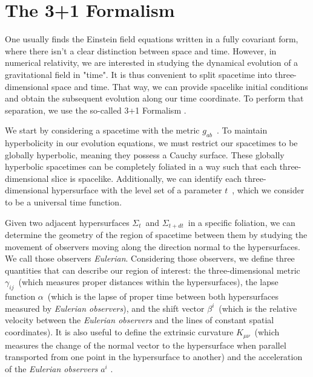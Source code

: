 \section{The 3+1 Formalism}
\label{section:3+1_formalism}

One usually finds the Einstein field equations written in a fully covariant form, where there isn't a clear distinction between space and time. However, in numerical relativity, we are interested in studying the dynamical evolution of a gravitational field in "time". It is thus convenient to split spacetime into three-dimensional space and time. That way, we can provide spacelike initial conditions and obtain the subsequent evolution along our time coordinate. To perform that separation, we use the so-called 3+1 Formalism \cite{3+1_Formalism_and_Bases_of_Numerical_Relativity,Introduction_to_3+1_numerical_relativity,Numerical_Relativity_Solving_Einsteins_Equations_on_the_Computer}.

We start by considering a spacetime with the metric $g_{ab}$~. To maintain hyperbolicity in our evolution equations, we must restrict our spacetimes to be globally hyperbolic, meaning they possess a Cauchy surface. These globally hyperbolic spacetimes can be completely foliated in a way such that each three-dimensional slice is spacelike. Additionally, we can identify each three-dimensional hypersurface with the level set of a parameter $t$~, which we consider to be a universal time function. 

Given two adjacent hypersurfaces $\Sigma_t$~and $\Sigma_{t+dt}$~in a specific foliation, we can determine the geometry of the region of spacetime between them by studying the movement of observers moving along the direction normal to the hypersurfaces. We call those observers \textit{Eulerian}. Considering those observers, we define three quantities that can describe our region of interest: the three-dimensional metric $\gamma_{ij}$~(which measures proper distances within the hypersurfaces), the lapse function $\alpha$~(which is the lapse of proper time between both hypersurfaces measured by \textit{Eulerian observers}), and the shift vector $\beta^i$~(which is the relative velocity between the \textit{Eulerian observers} and the lines of constant spatial coordinates). It is also useful to define the extrinsic curvature $K_{\mu\nu}$~(which measures the change of the normal vector to the hypersurface when parallel transported from one point in the hypersurface to another) and the acceleration of the \textit{Eulerian observers} $a^i$ \cite{3+1_Formalism_and_Bases_of_Numerical_Relativity,Introduction_to_3+1_numerical_relativity,Numerical_Relativity_Solving_Einsteins_Equations_on_the_Computer}.

